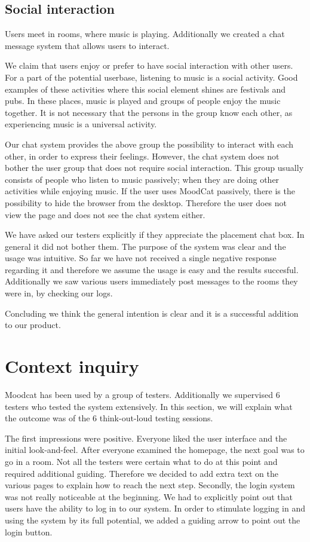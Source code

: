 \subsection{Social interaction}

Users meet in rooms, where music is playing.
Additionally we created a chat message system that allows users to interact.

We claim that users enjoy or prefer to have social interaction with other users.
For a part of the potential userbase, listening to music is a social activity.
Good examples of these activities where this social element shines are festivals and pubs.
In these places, music is played and groups of people enjoy the music together.
It is not necessary that the persons in the group know each other, as experiencing music is a universal activity.

Our chat system provides the above group the possibility to interact with each other, in order to express their feelings.
However, the chat system does not bother the user group that does not require social interaction.
This group usually consists of people who listen to music passively; when they are doing other activities while enjoying music.
If the user uses MoodCat passively, there is the possibility to hide the  browser from the desktop.
Therefore the user does not view the page and does not see the chat system either.

We have asked our testers explicitly if they appreciate the placement chat box.
In general it did not bother them.
The purpose of the system was clear and the usage was intuitive.
So far we have not received a single negative response regarding it and therefore we assume the usage is easy and the results succesful.
Additionally we saw various users immediately post messages to the rooms they were in, by checking our logs.

Concluding we think the general intention is clear and it is a successful addition to our product.

\section{Context inquiry}
Moodcat has been used by a group of testers.
Additionally we supervised 6 testers who tested the system extensively.
In this section, we will explain what the outcome was of the 6 think-out-loud testing sessions.

The first impressions were positive.
Everyone liked the user interface and the initial look-and-feel.
After everyone examined the homepage, the next goal was to go in a room.
Not all the testers were certain what to do at this point and required additional guiding.
Therefore we decided to add extra text on the various pages to explain how to reach the next step.
Secondly, the login system was not really noticeable at the beginning.
We had to explicitly point out that users have the ability to log in to our system.
In order to stimulate logging in and using the system by its full potential, we added a guiding arrow to point out the login button.

